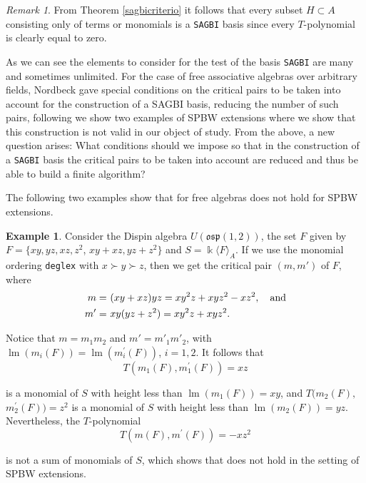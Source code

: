 \documentclass{amsart}
\theoremstyle{definition}
\newtheorem{example}[theorem]{Example}
\theoremstyle{remark}
\newtheorem{remark}[theorem]{Remark}
\numberwithin{equation}{section}
\begin{document}
\begin{remark}\label{NordbeckRemark2Analogue}
From Theorem \ref{sagbicriterio} it follows that every subset $H\subset A$ consisting only of terms or monomials is a \texttt{SAGBI} basis since every $T$-polynomial is clearly equal to zero.
\end{remark}

As we can see the elements to consider for the test of the basis \texttt{SAGBI} are many and sometimes unlimited. For the case of free associative algebras over arbitrary fields, Nordbeck  \cite{Nordbeck1998} gave special conditions on the critical pairs to be taken into account for the construction of a SAGBI basis, reducing the number of such pairs, following we show two examples of SPBW extensions where we show that this construction is not valid in our object of study. From the above, a new question arises: What conditions should we impose so that in the construction of a \texttt{SAGBI} basis the critical pairs to be taken into account are reduced and thus be able to build a finite algorithm?

The following two examples show that \cite[Proposition 6]{Nordbeck1998} for free algebras does not hold for SPBW extensions.

\begin{example}
Consider the Dispin algebra $U(\mathfrak{osp}(1,2))$,  the set $F$ given by $F = \{xy, yz, xz, z^2$, $xy+xz, yz+z^2\}$ and $S=\Bbbk\langle F\rangle_A$. If we use the monomial ordering \texttt{deglex} with $x\succ y\succ z$, then we get the critical pair $(m, m')$ of $F$, where
\begin{align*}
    m = &\ (xy+xz)yz=xy^2z+xyz^2-xz^2,\quad {\rm and}\\
    m' = &\ xy(yz+z^2)=xy^2z+xyz^2.
\end{align*}

Notice that $m=m_1m_2$ and $m'=m'_1m'_2$, with $\operatorname{lm}(m_{i}(F))=\operatorname{lm}(m_{i}^{\prime}(F))$, $i=1,2$. It follows that 
$$
T(m_{1}(F), m_{1}^{\prime}(F)) = xz
$$ 

is a monomial of $S$ with height less than $\operatorname{lm}(m_1(F))=xy$, and $T(m_{2}(F),$ $m_{2}^{\prime}(F))=z^2$ is a monomial of $S$ with height less than $\operatorname{lm}(m_2(F))=yz$. Nevertheless, the $T$-polynomial 
$$
T(m(F), m^{\prime}(F))=-xz^2
$$ 

is not a sum of monomials of $S$, which shows that \cite[Proposition 6]{Nordbeck1998} does not hold in the setting of SPBW extensions.
\end{example}
\end{document}
